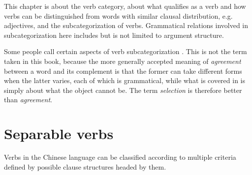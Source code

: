 \documentclass[../main.tex]{subfiles}
\begin{document}
This chapter is about the verb category, about what qualifies as a verb and 
how verbs can be distinguished from words with similar clausal distribution, e.g. adjectives,
and the subcategorization of verbs.
Grammatical relations involved in subcategorization here includes but is not limited to argument structure.

Some people call certain aspects of verb subcategorization  
\citep[]{li1989mandarin}.
This is not the term taken in this book, 
because the more generally accepted meaning of \emph{agreement} between a word and its complement 
is that the former can take different forms when the latter varies, each of which is grammatical,
while what is covered in \citet[]{li1989mandarin} is simply about what the object cannot be.
The term \emph{selection} is therefore better than \emph{agreement}.

\section{Separable verbs}

Verbs in the Chinese language can be classified according to multiple criteria defined by possible clause 
structures headed by them. %
\end{document}
